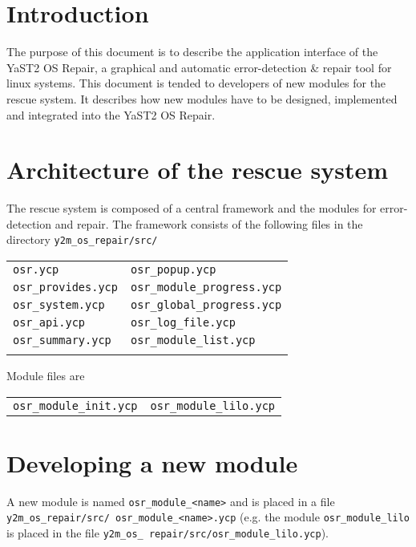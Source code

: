 \section{Introduction}
The purpose of this document is to describe the application interface
of the YaST2 OS Repair, a graphical and automatic error-detection \& repair
tool for linux systems. This document is tended to developers of new modules
for the rescue system. It describes how new modules have to be designed,
implemented and integrated into the YaST2 OS Repair.

\section{Architecture of the rescue system}
The rescue system is composed of a central framework and the modules for
error-detection and repair. The framework consists of the following files
in the directory \verb+y2m_os_repair/src/+\\

\begin{tabular}{p{5cm}p{5cm}}
\verb+osr.ycp+          & \verb+osr_popup.ycp+\\
\verb+osr_provides.ycp+ & \verb+osr_module_progress.ycp+\\
\verb+osr_system.ycp+   & \verb+osr_global_progress.ycp+\\
\verb+osr_api.ycp+      & \verb+osr_log_file.ycp+\\
\verb+osr_summary.ycp+  & \verb+osr_module_list.ycp+\\\\
\end{tabular}

Module files are\\

\begin{tabular}{p{5cm}p{5cm}}
\verb+osr_module_init.ycp+ & \verb+osr_module_lilo.ycp+\\
\end{tabular}

\section{Developing a new module}
A new module is named \verb+osr_module_<name>+ and is placed in a file
{\tt y2m\_os\_repair/src/ osr\_module\_<name>.ycp} (e.g. the module
\verb+osr_module_lilo+ is placed in the file 
{\tt y2m\_os\_ repair/src/osr\_module\_lilo.ycp}).\\

